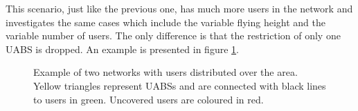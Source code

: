 This scenario, just like the previous one, has much more users in the network 
and investigates the same cases which include the variable flying height and the variable number of  users.
The only difference is that the restriction of only one \gls{UABS} is dropped.
An example is presented in figure \ref{fig:s3:distribution}.
\begin{figure}[!htb]
  \hfill
  \caption{Example of two networks with users distributed over the area. Yellow triangles represent \acs{UABS}s and are connected 
  with black lines to users in green. Uncovered users are coloured in red.}
  \label{fig:s3:distribution}
\end{figure}

